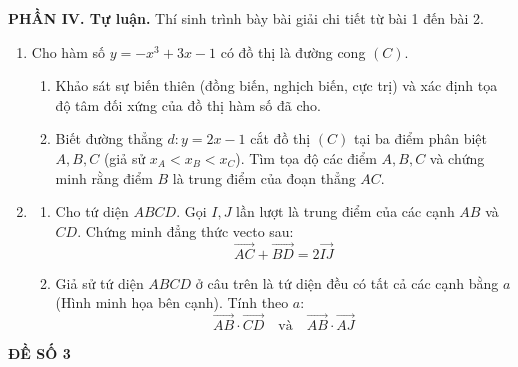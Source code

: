 \documentclass[12pt]{article}
\begin{document}
	\vspace{4mm}
	\noindent\textbf{PHẦN IV. Tự luận.} Thí sinh trình bày bài giải chi tiết từ bài 1 đến bài 2.
	\vspace{2mm}
	
	\begin{enumerate}[label=\textbf{Bài \arabic*.}, leftmargin=*]
		
		\item Cho hàm số $y = -x^3 + 3x - 1$ có đồ thị là đường cong $(C)$.
		\begin{enumerate}[label=\alph*)]
			\item  Khảo sát sự biến thiên (đồng biến, nghịch biến, cực trị) và xác định tọa độ tâm đối xứng của đồ thị hàm số đã cho.
			\item  Biết đường thẳng $d: y = 2x - 1$ cắt đồ thị $(C)$ tại ba điểm phân biệt $A, B, C$ (giả sử $x_A < x_B < x_C$). Tìm tọa độ các điểm $A, B, C$ và chứng minh rằng điểm $B$ là trung điểm của đoạn thẳng $AC$.
		\end{enumerate}
		
		\vspace{4mm}
		\item 
		\begin{enumerate}[label=\alph*)]
			\item  Cho tứ diện $ABCD$. Gọi $I, J$ lần lượt là trung điểm của các cạnh $AB$ và $CD$. Chứng minh đẳng thức vecto sau:
			\[ \overrightarrow{AC} + \overrightarrow{BD} = 2\overrightarrow{IJ} \]
			\item Giả sử tứ diện $ABCD$ ở câu trên là tứ diện đều có tất cả các cạnh bằng $a$ (Hình minh họa bên cạnh). Tính theo $a$: 
			\[ \overrightarrow{AB} \cdot \overrightarrow{CD} \quad \text{và} \quad \overrightarrow{AB} \cdot \overrightarrow{AJ} \]
		\end{enumerate}
		\hfill
		
	\end{enumerate}
	
	\newpage
	\begin{center}
		{\LARGE \textbf{ĐỀ SỐ 3}}\\[4pt]
	\end{center}
	\vspace{4mm}
	
\end{document}

